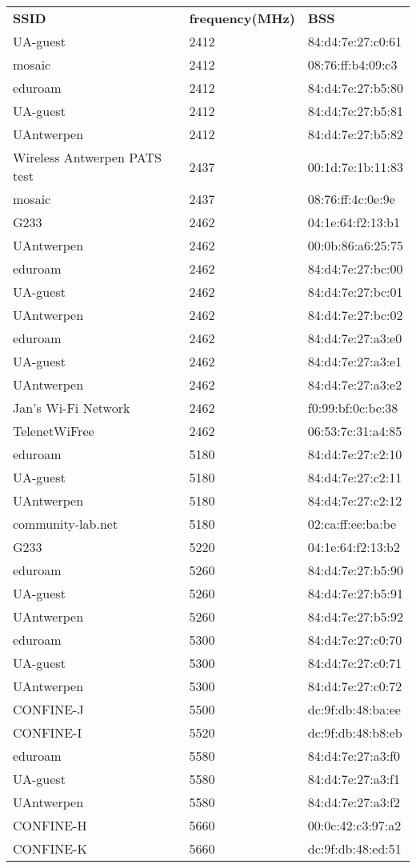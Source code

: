 \begin{center}
\begin{tabular}{lll}
\textbf{SSID }& \textbf{frequency(MHz)} & \textbf{BSS} \\
UA-guest & 2412 & 84:d4:7e:27:c0:61 \\
mosaic & 2412 & 08:76:ff:b4:09:c3 \\
eduroam & 2412 & 84:d4:7e:27:b5:80 \\
UA-guest & 2412 & 84:d4:7e:27:b5:81 \\
UAntwerpen & 2412 & 84:d4:7e:27:b5:82 \\
Wireless Antwerpen PATS test & 2437 & 00:1d:7e:1b:11:83 \\
mosaic & 2437 & 08:76:ff:4c:0e:9e \\
G233 & 2462 & 04:1e:64:f2:13:b1 \\
UAntwerpen & 2462 & 00:0b:86:a6:25:75 \\
eduroam & 2462 & 84:d4:7e:27:bc:00 \\
UA-guest & 2462 & 84:d4:7e:27:bc:01 \\
UAntwerpen & 2462 & 84:d4:7e:27:bc:02 \\
eduroam & 2462 & 84:d4:7e:27:a3:e0 \\
UA-guest & 2462 & 84:d4:7e:27:a3:e1 \\
UAntwerpen & 2462 & 84:d4:7e:27:a3:e2 \\
Jan's Wi-Fi Network & 2462 & f0:99:bf:0c:be:38 \\
TelenetWiFree & 2462 & 06:53:7c:31:a4:85 \\
eduroam & 5180 & 84:d4:7e:27:c2:10 \\
UA-guest & 5180 & 84:d4:7e:27:c2:11 \\
UAntwerpen & 5180 & 84:d4:7e:27:c2:12 \\
community-lab.net & 5180 & 02:ca:ff:ee:ba:be \\
G233 & 5220 & 04:1e:64:f2:13:b2 \\
eduroam & 5260 & 84:d4:7e:27:b5:90 \\
UA-guest & 5260 & 84:d4:7e:27:b5:91 \\
UAntwerpen & 5260 & 84:d4:7e:27:b5:92 \\
eduroam & 5300 & 84:d4:7e:27:c0:70 \\
UA-guest & 5300 & 84:d4:7e:27:c0:71 \\
UAntwerpen & 5300 & 84:d4:7e:27:c0:72 \\
CONFINE-J & 5500 & dc:9f:db:48:ba:ee \\
CONFINE-I & 5520 & dc:9f:db:48:b8:eb \\
eduroam & 5580 & 84:d4:7e:27:a3:f0 \\
UA-guest & 5580 & 84:d4:7e:27:a3:f1 \\
UAntwerpen & 5580 & 84:d4:7e:27:a3:f2 \\
CONFINE-H & 5660 & 00:0c:42:c3:97:a2 \\
CONFINE-K & 5660 & dc:9f:db:48:ed:51 \\
\end{tabular}
\end{center}
